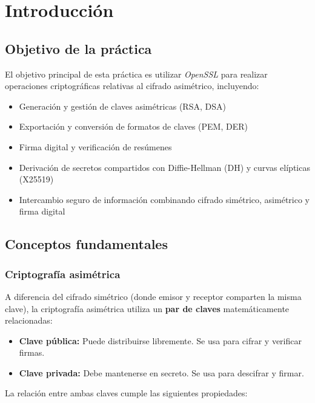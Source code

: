 \chapter{Introducción}

\section{Objetivo de la práctica}

El objetivo principal de esta práctica es utilizar \textit{OpenSSL} para realizar 
operaciones criptográficas relativas al cifrado asimétrico, incluyendo:

\begin{itemize}[label=\textbullet]
    \item Generación y gestión de claves asimétricas (RSA, DSA)
    \item Exportación y conversión de formatos de claves (PEM, DER)
    \item Firma digital y verificación de resúmenes
    \item Derivación de secretos compartidos con Diffie-Hellman (DH) y curvas elípticas (X25519)
    \item Intercambio seguro de información combinando cifrado simétrico, asimétrico y firma digital
\end{itemize}

\section{Conceptos fundamentales}

\subsection{Criptografía asimétrica}

A diferencia del cifrado simétrico (donde emisor y receptor comparten la misma clave), la criptografía asimétrica utiliza un \textbf{par de claves} matemáticamente relacionadas:

\begin{itemize}[label=\textbullet]
    \item \textbf{Clave pública:} Puede distribuirse libremente. Se usa para cifrar y verificar firmas.
    \item \textbf{Clave privada:} Debe mantenerse en secreto. Se usa para descifrar y firmar.
\end{itemize}

La relación entre ambas claves cumple las siguientes propiedades:

